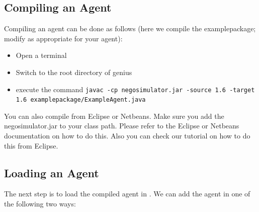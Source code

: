 \documentclass[]{article}
\begin{document}
\subsection{Compiling an Agent}
Compiling an agent can be done as follows (here we compile the examplepackage; modify as appropriate for your agent):
\begin{itemize}
\item Open a terminal
\item Switch to the root directory of genius
\item execute the command \texttt{javac -cp negosimulator.jar -source 1.6 -target 1.6  examplepackage/ExampleAgent.java}
\end{itemize}

You can also compile from Eclipse or Netbeans. Make sure you add the negosimulator.jar to your class path. Please refer to the Eclipse or Netbeans documentation on how to do this. Also you can check our tutorial on how to do this from Eclipse.

\subsection{Loading an Agent}
The next step is to load the compiled agent in \Genius. We can add the agent in one of the following two ways:
\end{document}
